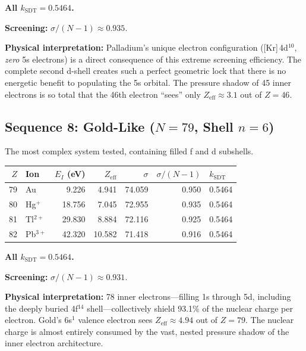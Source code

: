 \textbf{All $k_{\text{SDT}} = 0.5464$.}

\textbf{Screening:} $\sigma/(N{-}1) \approx 0.935$.

\textbf{Physical interpretation:} Palladium's unique electron configuration ([Kr]\,4d$^{10}$, \emph{zero} 5s electrons) is a direct consequence of this extreme screening efficiency.  The complete second d-shell creates such a perfect geometric lock that there is no energetic benefit to populating the 5s orbital.  The pressure shadow of 45 inner electrons is so total that the 46th electron ``sees'' only $Z_{\text{eff}} \approx 3.1$ out of $Z = 46$.


\subsection{Sequence 8: Gold-Like ($N = 79$, Shell $n = 6$)}

The most complex system tested, containing filled f and d subshells.

\begin{center}
\begin{tabular}{rlrrrrl}
\hline
$Z$ & Ion & $E_I$ (eV) & $Z_{\text{eff}}$ & $\sigma$ & $\sigma/(N{-}1)$ & $k_{\text{SDT}}$ \\
\hline
79 & Au          &    9.226 &  4.941 & 74.059 & 0.950 & 0.5464 \\
80 & Hg$^+$      &   18.756 &  7.045 & 72.955 & 0.935 & 0.5464 \\
81 & Tl$^{2+}$   &   29.830 &  8.884 & 72.116 & 0.925 & 0.5464 \\
82 & Pb$^{3+}$   &   42.320 & 10.582 & 71.418 & 0.916 & 0.5464 \\
\hline
\end{tabular}
\end{center}

\textbf{All $k_{\text{SDT}} = 0.5464$.}

\textbf{Screening:} $\sigma/(N{-}1) \approx 0.931$.

\textbf{Physical interpretation:} 78 inner electrons---filling 1s through 5d, including the deeply buried 4f$^{14}$ shell---collectively shield 93.1\% of the nuclear charge per electron.  Gold's 6s$^1$ valence electron sees $Z_{\text{eff}} \approx 4.94$ out of $Z = 79$.  The nuclear charge is almost entirely consumed by the vast, nested pressure shadow of the inner electron architecture.


